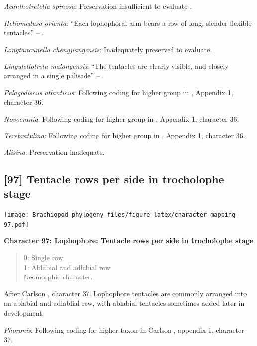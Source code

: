\documentclass[]{book}
\theoremstyle{definition}
\theoremstyle{definition}
\theoremstyle{definition}
\theoremstyle{remark}
\begin{document}
\emph{Acanthotretella spinosa}: Preservation insufficient to evaluate
\citep{Holmer2006Aspinose}.

\emph{Heliomedusa orienta}: ``Each lophophoral arm bears a row of long,
slender flexible tentacles'' -- \citet{Zhang2009Architectureand}.

\emph{Longtancunella chengjiangensis}: Inadequately preserved to
evaluate.

\emph{Lingulellotreta malongensis}: ``The tentacles are clearly visible,
and closely arranged in a single palisade'' -- \citet{Zhang2004Newdata}.

\emph{Pelagodiscus atlanticus}: Following coding for higher group in
\citet{Carlson1995Phylogeneticrelationships}, Appendix 1, character 36.

\emph{Novocrania}: Following coding for higher group in
\citet{Carlson1995Phylogeneticrelationships}, Appendix 1, character 36.

\emph{Terebratulina}: Following coding for higher group in
\citet{Carlson1995Phylogeneticrelationships}, Appendix 1, character 36.

\emph{Alisina}: Preservation inadequate.

\hypertarget{tentacle-rows-per-side-in-trocholophe-stage}{%
\subsection*{{[}97{]} Tentacle rows per side in trocholophe
stage}\label{tentacle-rows-per-side-in-trocholophe-stage}}

\texttt{[image: Brachiopod\_phylogeny\_files/figure-latex/character-mapping-97.pdf]}

\textbf{Character 97: Lophophore: Tentacle rows per side in trocholophe
stage}

\begin{quote}
0: Single row\\
1: Ablabial and adlabial row\\
Neomorphic character.
\end{quote}

After Carlson \citeyearpar{Carlson1995Phylogeneticrelationships},
character 37. Lophophore tentacles are commonly arranged into an
ablabial and adlablial row, with ablabial tentacles sometimes added
later in development.

\emph{Phoronis}: Following coding for higher taxon in Carlson
\citeyearpar{Carlson1995Phylogeneticrelationships}, appendix 1,
character 37.
\end{document}
